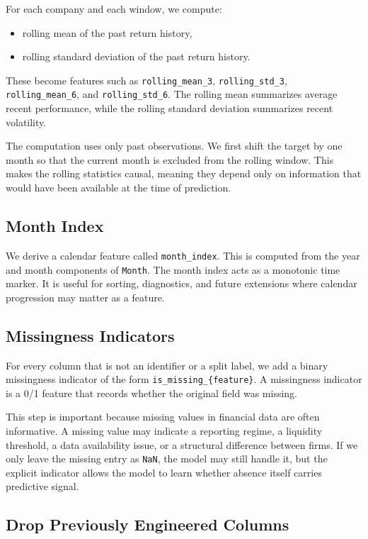 \documentclass[11pt]{article}
\begin{document}
For each company and each window, we compute:
\begin{itemize}
    \item rolling mean of the past return history,
    \item rolling standard deviation of the past return history.
\end{itemize}

These become features such as \texttt{rolling\_mean\_3}, \texttt{rolling\_std\_3}, \texttt{rolling\_mean\_6}, and \texttt{rolling\_std\_6}. The rolling mean summarizes average recent performance, while the rolling standard deviation summarizes recent volatility.

The computation uses only past observations. We first shift the target by one month so that the current month is excluded from the rolling window. This makes the rolling statistics causal, meaning they depend only on information that would have been available at the time of prediction.

\subsection{Month Index}

We derive a calendar feature called \texttt{month\_index}. This is computed from the year and month components of \texttt{Month}. The month index acts as a monotonic time marker. It is useful for sorting, diagnostics, and future extensions where calendar progression may matter as a feature.

\subsection{Missingness Indicators}

For every column that is not an identifier or a split label, we add a binary missingness indicator of the form \texttt{is\_missing\_\{feature\}}. A missingness indicator is a 0/1 feature that records whether the original field was missing.

This step is important because missing values in financial data are often informative. A missing value may indicate a reporting regime, a liquidity threshold, a data availability issue, or a structural difference between firms. If we only leave the missing entry as \texttt{NaN}, the model may still handle it, but the explicit indicator allows the model to learn whether absence itself carries predictive signal.

\subsection{Drop Previously Engineered Columns}
\end{document}
